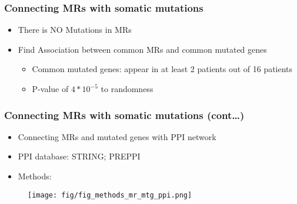 \documentclass{beamer}
\begin{document}
\begin{frame}
\frametitle{Connecting MRs with somatic mutations}
 \begin{itemize}
 	\item There is {\color{red} NO} Mutations in MRs
  	\item Find Association between common MRs and common mutated genes 
  	\begin{itemize}
	  	\item Common mutated genes: appear in at least 2 patients out of 16 patients
	  	\item P-value of $4*10^{-5}$ to randomness 
  	\end{itemize}
\end{itemize}
\end{frame}
\begin{frame}
\frametitle{Connecting MRs with somatic mutations (cont\dots)}
\begin{itemize}
	\item Connecting MRs and mutated genes with PPI network
	\item PPI database: STRING; PREPPI
	\item Methods: 
\end{itemize}
	\begin{figure}
		\texttt{[image: fig/fig\_methods\_mr\_mtg\_ppi.png]}
	\end{figure}
\end{frame}
\end{document}
